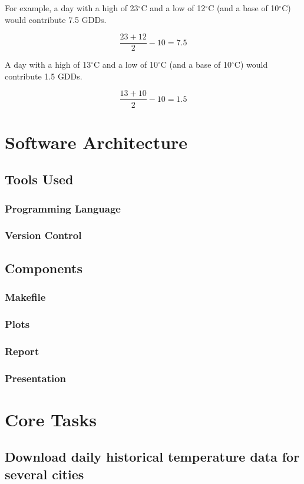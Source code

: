 \documentclass{article}
\begin{document}
For example, a day with a high of 23$^{\circ}$C and a low of 12$^{\circ}$C (and a base of 10$^{\circ}$C) would contribute 7.5 GDDs.\vspace{5mm}

\[ \frac {23+12}{2}-10=7.5 \] \par

A day with a high of 13$^{\circ}$C and a low of 10$^{\circ}$C (and a base of 10$^{\circ}$C) would contribute 1.5 GDDs.\vspace{5mm}

\[ \frac {13+10}{2}-10=1.5 \] \par

\noindent
\section{ \bf Software Architecture}
\subsection{Tools Used}
\subsubsection{Programming Language}
\subsubsection{Version Control}
\subsection{Components}
\subsubsection{Makefile}
\subsubsection{Plots}
\subsubsection{Report}
\subsubsection{Presentation}

\section{ \bf Core Tasks}
\subsection{Download daily historical temperature data for several cities}
\end{document}
